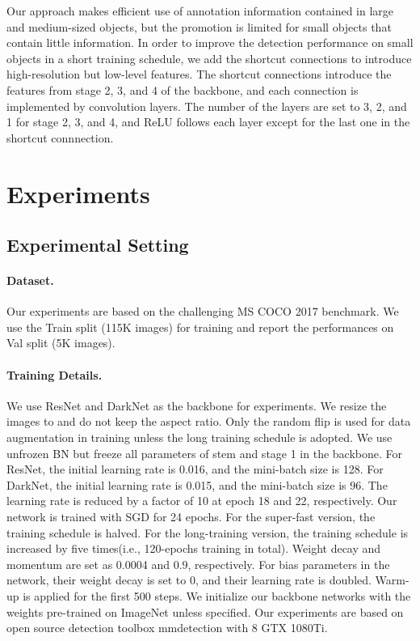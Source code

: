 \documentclass[letterpaper]{article} \usepackage{aaai20}  \usepackage{times}  \usepackage{helvet} \usepackage{courier}  \usepackage[hyphens]{url}  \usepackage{graphicx} \urlstyle{rm} \def\UrlFont{\rm}  \usepackage{graphicx}  \frenchspacing  \setlength{\pdfpagewidth}{8.5in}  \setlength{\pdfpageheight}{11in}  \usepackage{subcaption}
\begin{document}
Our approach makes efficient use of annotation information contained in large and medium-sized objects, but the promotion is limited for small objects that contain little information. In order to improve the detection performance on small objects in a short training schedule, we add the shortcut connections to introduce high-resolution but low-level features. The shortcut connections introduce the features from stage 2, 3, and 4 of the backbone, and each connection is implemented by  convolution layers. The number of the layers are set to 3, 2, and 1 for stage 2, 3, and 4, and ReLU follows each layer except for the last one in the shortcut connnection.

\section{Experiments}

\subsection{Experimental Setting}

\paragraph{Dataset.} Our experiments are based on the challenging MS COCO 2017 benchmark. We use the Train split (115K images) for training and report the performances on Val split (5K images).

\paragraph{Training Details.} We use ResNet and DarkNet as the backbone for experiments. We resize the images to  and do not keep the aspect ratio. Only the random flip is used for data augmentation in training unless the long training schedule is adopted. We use unfrozen BN but freeze all parameters of stem and stage 1 in the backbone. For ResNet, the initial learning rate is 0.016, and the mini-batch size is 128. For DarkNet, the initial learning rate is 0.015, and the mini-batch size is 96. The learning rate is reduced by a factor of 10 at epoch 18 and 22, respectively. Our network is trained with SGD for 24 epochs. For the super-fast version, the training schedule is halved. For the long-training version, the training schedule is increased by five times(i.e., 120-epochs training in total). Weight decay and momentum are set as 0.0004 and 0.9, respectively. For bias parameters in the network, their weight decay is set to 0, and their learning rate is doubled. Warm-up is applied for the first 500 steps. We initialize our backbone networks with the weights pre-trained on ImageNet \cite{deng2009imagenet} unless specified. Our experiments are based on open source detection toolbox mmdetection \cite{DBLP:journals/corr/abs-1906-07155} with 8 GTX 1080Ti.
\end{document}
